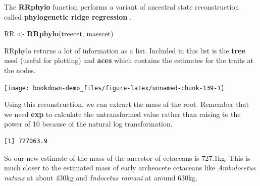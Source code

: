 \documentclass[
]{book}
\newenvironment{Shaded}{\begin{snugshade}}{\end{snugshade}}
\newcommand{\DataTypeTok}[1]{\textcolor[rgb]{0.13,0.29,0.53}{#1}}
\newcommand{\DecValTok}[1]{\textcolor[rgb]{0.00,0.00,0.81}{#1}}
\newcommand{\FloatTok}[1]{\textcolor[rgb]{0.00,0.00,0.81}{#1}}
\newcommand{\KeywordTok}[1]{\textcolor[rgb]{0.13,0.29,0.53}{\textbf{#1}}}
\newcommand{\NormalTok}[1]{#1}
\newcommand{\OperatorTok}[1]{\textcolor[rgb]{0.81,0.36,0.00}{\textbf{#1}}}
\newcommand{\OtherTok}[1]{\textcolor[rgb]{0.56,0.35,0.01}{#1}}
\newcommand{\StringTok}[1]{\textcolor[rgb]{0.31,0.60,0.02}{#1}}
\begin{document}
The \textbf{RRphylo} function performs a variant of ancestral state reconstruction called \textbf{phylogenetic ridge regression} \citep{Castiglione20}.

\begin{Shaded}
\begin{Highlighting}[]
\NormalTok{RR \textless{}{-}}\StringTok{ }\KeywordTok{RRphylo}\NormalTok{(treecet, masscet)}
\end{Highlighting}
\end{Shaded}

RRphylo returns a lot of information as a list. Included in this list is the \textbf{tree} used (useful for plotting) and \textbf{aces} which contains the estimates for the traits at the nodes.

\begin{Shaded}
\end{Shaded}

\begin{center}\texttt{[image: bookdown-demo\_files/figure-latex/unnamed-chunk-139-1]} \end{center}

Using this reconstruction, we can extract the mass of the root. Remember that we need \textbf{exp} to calculate the untransformed value rather than raising to the power of 10 because of the natural log transformation.

\begin{Shaded}
\end{Shaded}

\begin{verbatim}
[1] 727063.9
\end{verbatim}

So our new estimate of the mass of the ancestor of cetaceans is 727.1kg. This is much closer to the estimated mass of early archeocete cetaceans like \emph{Ambulocetus natans} at about 430kg and \emph{Indocetus ramani} at around 630kg.
\end{document}
